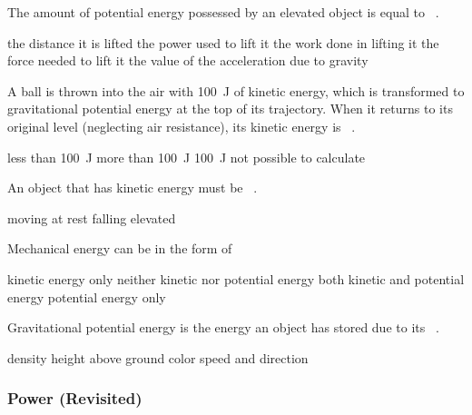 \documentclass[]{exam}
\begin{document}
\begin{questions}
\question
The amount of potential energy possessed by an elevated object is equal to \fillin\ .

\begin{randomizechoices}
\choice the distance it is lifted
\choice the power used to lift it
\correctchoice the work done in lifting it
\choice the force needed to lift it
\choice the value of the acceleration due to gravity
\end{randomizechoices}

\question
A  ball is thrown into the air with \SI{100}{J} of kinetic energy, which is transformed to gravitational potential energy at the top of its trajectory. When it returns to its original level (neglecting air resistance), its kinetic energy is \fillin\ .

\begin{randomizechoices}
\choice less than \SI{100}{J}
\choice more than \SI{100}{J}
\correctchoice \SI{100}{J}
\choice not possible to calculate
\end{randomizechoices}

\question
An object that has kinetic energy must be \fillin\ .

\begin{randomizechoices}
\correctchoice moving
\choice at rest
\choice falling
\choice elevated
\end{randomizechoices}


\question
Mechanical energy can be in the form of

\begin{randomizechoices}
\choice kinetic energy only
\choice neither kinetic nor potential energy
\correctchoice both kinetic and potential energy
\choice potential energy only
\end{randomizechoices}

\question
Gravitational potential energy is the energy an object has stored due to its \fillin\ .

\begin{randomizechoices}
\choice density
\correctchoice height above ground
\choice color
\choice speed and direction
\end{randomizechoices}


\end{questions}

\subsubsection{Power (Revisited)}
\end{document}
